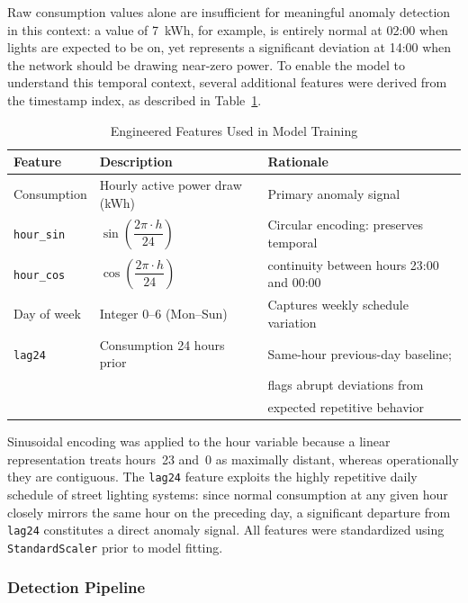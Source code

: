 \documentclass{article}
\begin{document}
Raw consumption values alone are insufficient for meaningful anomaly
detection in this context: a value of 7~kWh, for example, is entirely
normal at 02:00 when lights are expected to be on, yet represents a
significant deviation at 14:00 when the network should be drawing
near-zero power. To enable the model to understand this temporal
context, several additional features were derived from the timestamp
index, as described in Table~\ref{tab:features}.

\begin{table}[h]
\centering
\caption{Engineered Features Used in Model Training}
\label{tab:features}
\begin{tabular}{p{3.2cm}p{4.5cm}p{5.5cm}}
\hline
\textbf{Feature} & \textbf{Description} & \textbf{Rationale} \\
\hline
Consumption        & Hourly active power draw (kWh) & Primary anomaly signal \\
\texttt{hour\_sin} & $\sin\!\left(\dfrac{2\pi \cdot h}{24}\right)$ &
  Circular encoding: preserves temporal \\
\texttt{hour\_cos} & $\cos\!\left(\dfrac{2\pi \cdot h}{24}\right)$ &
  continuity between hours 23:00 and 00:00 \\
Day of week        & Integer 0--6 (Mon--Sun) & Captures weekly schedule variation \\
\texttt{lag24}     & Consumption 24 hours prior & Same-hour previous-day baseline; \\
                   &                            & flags abrupt deviations from \\
                   &                            & expected repetitive behavior \\
\hline
\end{tabular}
\end{table}

Sinusoidal encoding was applied to the hour variable because a linear
representation treats hours~23 and~0 as maximally distant, whereas
operationally they are contiguous. The \texttt{lag24} feature exploits
the highly repetitive daily schedule of street lighting systems: since
normal consumption at any given hour closely mirrors the same hour on
the preceding day, a significant departure from \texttt{lag24}
constitutes a direct anomaly signal. All features were standardized
using \texttt{StandardScaler} prior to model fitting.

\subsubsection{Detection Pipeline}
\end{document}
